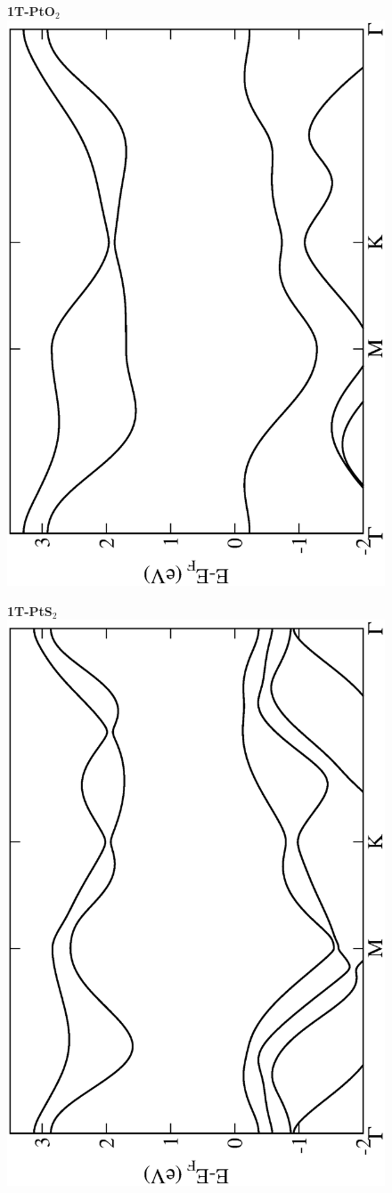 \begin{figure}[htbp]
\centering
{\bfseries \sffamily 1T-PtO$_{2}$}\\
\includegraphics[width=0.45\linewidth, angle=-90, trim={2.9cm, 0cm, 2cm, 0cm}, clip]{img/SI_figs/BS/1T-PtO2.eps}
\end{figure}

\begin{figure}[htbp]
\centering
{\bfseries \sffamily 1T-PtS$_{2}$}\\
\includegraphics[width=0.45\linewidth, angle=-90, trim={2.9cm, 0cm, 2cm, 0cm}, clip]{img/SI_figs/BS/1T-PtS2.eps}
\end{figure}

